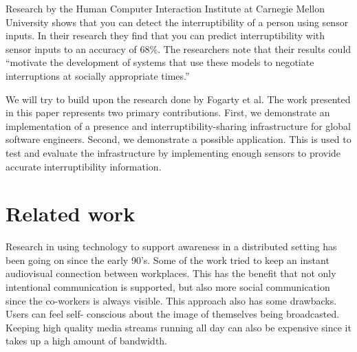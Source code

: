 \documentclass{sigchi}
\begin{document}
Research by the Human Computer Interaction Institute at Carnegie Mellon University \cite{Fogarty:2005:PHI:1057237.1057243} shows that you can detect the interruptibility of a person using sensor inputs.
In their research they find that you can predict interruptibility with sensor inputs to an accuracy of 68\%.
The researchers note that their results could ``motivate the development of systems that use these models to negotiate interruptions at socially appropriate times.''

We will try to build upon the research done by Fogarty et al.
The work presented in this paper represents two primary contributions.
First, we demonstrate an implementation of a presence and interruptibility-sharing infrastructure for global software engineers.
Second, we demonstrate a possible application. This is used to test and evaluate the infrastructure by implementing enough sensors to provide accurate interruptibility information.





\section{Related work}
Research in using technology to support awareness in a distributed setting has been going on since the early 90’s. Some of the work\cite{bly1993media}\cite{gaver1992realizing}\cite{mantei1991experiences} tried to keep an instant audiovisual connection between workplaces. This has the benefit that not only intentional communication is supported, but also more social communication since the co-workers is always visible. This approach also has some drawbacks. Users can feel self- conscious about the image of themselves being broadcasted. Keeping high quality media streams running all day can also be expensive since it takes up a high amount of bandwidth.
\end{document}
